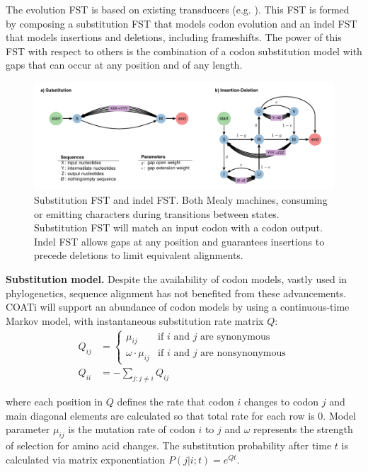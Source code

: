 The evolution FST is based on existing transducers
(e.g. \cite{holmes2001evolutionary}).
This FST is formed by composing a substitution FST that models codon
evolution and an indel FST that models insertions and deletions, including
frameshifts.
The power of this FST with respect to others is the combination of a codon
substitution model with gaps that can occur at any position and of any length.

\begin{figure}[h]
\centering
    \includegraphics[width=\textwidth]{figures/fig-evolution-fst.pdf}
    \caption{Substitution FST and indel FST. Both Mealy machines, consuming or
    emitting characters during transitions between states. Substitution FST will
    match an input codon with a codon output.
    Indel FST allows gaps at any position and guarantees insertions to precede
    deletions to limit equivalent alignments.}
    \label{fig:evolution-fst}
\end{figure}

\vspace{2em}

\textbf{Substitution model.}
Despite the availability of codon models, vastly used in phylogenetics, sequence
alignment has not benefited from these advancements.
COATi will support an abundance of codon models by using a continuous-time
Markov model, with instantaneous substitution rate matrix $Q$:
\begin{align*} Q_{ij} &= \begin{cases}
    \mu_{ij} & \text{if $i$ and $j$ are synonymous}\\
    \omega \cdot \mu_{ij} & \text{if $i$ and $j$ are nonsynonymous}
    \end{cases}\\[10pt]
   Q_{ii} &= -\sum_{j:j \neq i} Q_{ij}
\end{align*}

where each position in $Q$ defines the rate that codon $i$ changes to codon $j$
and main diagonal elements are calculated so that total rate for each row is 0.
Model parameter $\mu_{ij}$ is the mutation rate of codon $i$ to $j$ and $\omega$
represents the strength of selection for amino acid changes.
The substitution probability after time $t$ is calculated via matrix
exponentiation $P(j|i;t) = e^{Qt}$.

